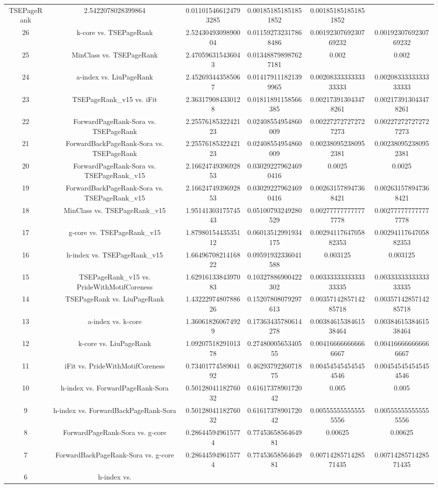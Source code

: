 \documentclass[a4paper,10pt]{article}
\begin{document}
\begin{landscape}
\begin{table}[!htp]
\begin{tabular}{cccccc}
TSEPageRank&2.5422078028399864&0.011015466124793285&0.001851851851851852&0.001851851851851852\\26&k-core vs. TSEPageRank&2.5243049309890004&0.011592732317868486&0.0019230769230769232&0.0019230769230769232\\25&MinClass vs. TSEPageRank&2.470596315436043&0.013488798987627181&0.002&0.002\\24&a-index vs. LiuPageRank&2.452693443585067&0.014179111821399965&0.0020833333333333333&0.0020833333333333333\\23&TSEPageRank_v15 vs. iFit&2.363179084330128&0.01811891158566385&0.002173913043478261&0.002173913043478261\\22&ForwardPageRank-Sora vs. TSEPageRank&2.2557618532242123&0.02408554954860009&0.002272727272727273&0.002272727272727273\\21&ForwardBackPageRank-Sora vs. TSEPageRank&2.2557618532242123&0.02408554954860009&0.002380952380952381&0.002380952380952381\\20&ForwardPageRank-Sora vs. TSEPageRank_v15&2.1662474939692853&0.030292279624690416&0.0025&0.0025\\19&ForwardBackPageRank-Sora vs. TSEPageRank_v15&2.1662474939692853&0.030292279624690416&0.002631578947368421&0.002631578947368421\\18&MinClass vs. TSEPageRank_v15&1.9514130317574543&0.05100793249280529&0.002777777777777778&0.002777777777777778\\17&g-core vs. TSEPageRank_v15&1.8798015443535112&0.06013512991934175&0.0029411764705882353&0.0029411764705882353\\16&h-index vs. TSEPageRank_v15&1.6649670821416822&0.09591932336041588&0.003125&0.003125\\15&TSEPageRank_v15 vs. PrideWithMotifCoreness&1.6291613384397083&0.10327886900422302&0.0033333333333333335&0.0033333333333333335\\14&TSEPageRank vs. LiuPageRank&1.4322297480788626&0.15207808079297613&0.0035714285714285718&0.0035714285714285718\\13&a-index vs. k-core&1.360618260674929&0.17363435780614278&0.0038461538461538464&0.0038461538461538464\\12&k-core vs. LiuPageRank&1.0920751829101378&0.2748000565340555&0.004166666666666667&0.004166666666666667\\11&iFit vs. PrideWithMotifCoreness&0.7340177458904192&0.4629379226071875&0.004545454545454546&0.004545454545454546\\10&h-index vs. ForwardPageRank-Sora&0.5012804118276032&0.6161737890172042&0.005&0.005\\9&h-index vs. ForwardBackPageRank-Sora&0.5012804118276032&0.6161737890172042&0.005555555555555556&0.005555555555555556\\8&ForwardPageRank-Sora vs. g-core&0.286445949615774&0.7745365856464981&0.00625&0.00625\\7&ForwardBackPageRank-Sora vs. g-core&0.286445949615774&0.7745365856464981&0.0071428571428571435&0.0071428571428571435\\6&h-index vs. 
\end{tabular}
\end{table}
\end{landscape}
\end{document}
